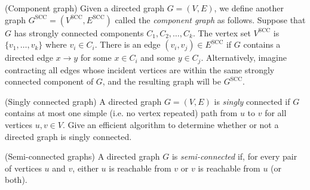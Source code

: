 \begin{questions}

\def\scc{\text{SCC}}  
\question (Component graph) Given a directed graph $G=(V,E)$, we
  define another graph $G^{\scc} =(V^\scc, E^\scc)$ called the
  \emph{component graph} as follows. Suppose that $G$ has strongly
  connected components $C_1, C_2, \ldots, C_k$. The vertex set
  $V^\scc$ is $\{v_1,\ldots,v_k\}$ where $v_i\in C_i$. There is an
  edge $ (v_i,v_j) \in E^\scc$ if $G$ contains a directed edge
  $x\to y$ for some $x\in C_i$ and some $y\in C_j$. Alternatively,
  imagine contracting all edges whose incident vertices are within the
  same strongly connected component of $G$, and the resulting graph
  will be $G^\scc$.
\newpage

\question[10] (Singly connected graph) A directed graph $G=(V,E)$ is
  \emph{singly} connected if $G$ contains at most one simple (i.e. no
  vertex repeated) path from $u$ to $v$ for all vertices $u,v\in V
  $. Give an efficient algorithm to determine whether or not a
  directed graph is singly connected.

\newpage
  
\question (Semi-connected graphs) A directed graph $G$ is
  \emph{semi-connected} if, for every pair of vertices $u$ and $v$,
  either $u$ is reachable from $v$ or $v$ is reachable from $u$ (or
  both).


\end{questions}
